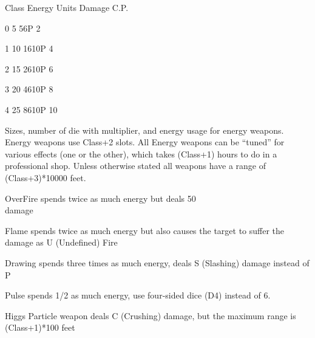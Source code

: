 \documentclass[twoside]{book}
\begin{document}
                  
                   Class   
                   Energy Units   
                   Damage 
                   C.P.   
                  
                  
                   0 
                   5   
                   56P 
                   2   
                  
                  
                   1 
                   10   
                   1610P 
                   4   
                  
                  
                   2 
                   15   
                   2610P 
                   6   
                  
                  
                   3 
                   20   
                   4610P 
                   8   
                  
                  
                   4 
                   25   
                   8610P 
                   10   
                  
                
                Sizes, number of die with multiplier, and
                 energy usage for energy weapons.
              Energy weapons use Class+2 slots.   All Energy weapons can be “tuned” for
               various effects (one or the other), which takes (Class+1)
               hours to do in a professional shop. Unless otherwise
               stated all weapons have a range of (Class+3)*10000 feet.
                 
              
                 OverFire   
                  spends twice as much energy but deals 50\\%
                 damage 
                
              
                 Flame   
                  spends twice as much energy but also causes the
                 target to suffer the damage as U (Undefined) Fire
                 
                
              
                 Drawing   
                  spends three times as much energy, deals S
                 (Slashing) damage instead of P 
                
              
                 Pulse   
                  spends 1/2 as much energy, use four-sided dice
                 (D4) instead of 6. 
                
              
                 Higgs Particle   
                  weapon deals C (Crushing) damage, but the maximum
                 range is (Class+1)*100 feet 
                
\end{document}
